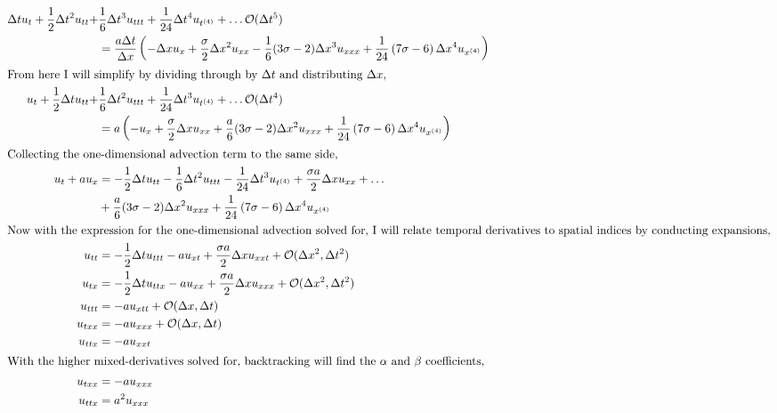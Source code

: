 \begin{enumerate}[label=\alph*., start = 1]
    \vspace{-0.35in}
    \begin{align*}
        \Delta tu_t + \frac{1}{2}\Delta t^2u_{tt} + & \frac{1}{6}\Delta t^3 u_{ttt} + \frac{1}{24}\Delta t^4u_{t^{(4)}} + \ldots \mathcal{O}(\Delta t^5) \\
        & = \frac{a\Delta t}{\Delta x}\left( - \Delta xu_x + \frac{\sigma}{2}\Delta x^2u_{xx} - \frac{1}{6}(3\sigma - 2)\Delta x^3u_{xxx} + \frac{1}{24}\left(7\sigma - 6\right)\Delta x^4u_{x^{(4)}} \right)\\
        \shortintertext{From here I will simplify by dividing through by $\Delta t$ and distributing $\Delta x$,}
        u_t + \frac{1}{2}\Delta tu_{tt} + & \frac{1}{6}\Delta t^2 u_{ttt} + \frac{1}{24}\Delta t^3u_{t^{(4)}} + \ldots \mathcal{O}(\Delta t^4) \\
        & = a\left(- u_x + \frac{\sigma}{2}\Delta xu_{xx} + \frac{a}{6}(3\sigma - 2)\Delta x^2u_{xxx} + \frac{1}{24}\left(7\sigma - 6\right)\Delta x^4u_{x^{(4)}}\right)\\
        \shortintertext{Collecting the one-dimensional advection term to the same side,}
        u_t + au_x & = -\frac{1}{2}\Delta tu_{tt} - \frac{1}{6}\Delta t^2 u_{ttt} - \frac{1}{24}\Delta t^3u_{t^{(4)}} + \frac{\sigma a}{2}\Delta xu_{xx} + \ldots \\
        & + \frac{a}{6}(3\sigma - 2)\Delta x^2u_{xxx} + \frac{1}{24}\left(7\sigma - 6\right)\Delta x^4u_{x^{(4)}}\\
        \shortintertext{Now with the expression for the one-dimensional advection solved for, I will relate temporal derivatives to spatial indices by conducting expansions,}
        u_{tt} & = -\frac{1}{2}\Delta t u_{ttt} - au_{xt} + \frac{\sigma a}{2}\Delta xu_{xxt} + \mathcal{O}(\Delta x^2, \Delta t^2)\\
        u_{tx} & = -\frac{1}{2}\Delta t u_{ttx} - au_{xx} + \frac{\sigma a}{2}\Delta xu_{xxx} + \mathcal{O}(\Delta x^2, \Delta t^2)\\
        u_{ttt} & = -au_{xtt} + \mathcal{O}(\Delta x, \Delta t)\\
        u_{txx} & = -au_{xxx} + \mathcal{O}(\Delta x, \Delta t)\\
        u_{ttx} & = -au_{xxt}\\
        \shortintertext{With the higher mixed-derivatives solved for, backtracking will find the $\alpha$ and $\beta$ coefficients,}
        u_{txx} & = -au_{xxx}\\
        u_{ttx} & = a^2u_{xxx}\\

\end{align*}
\end{enumerate}
